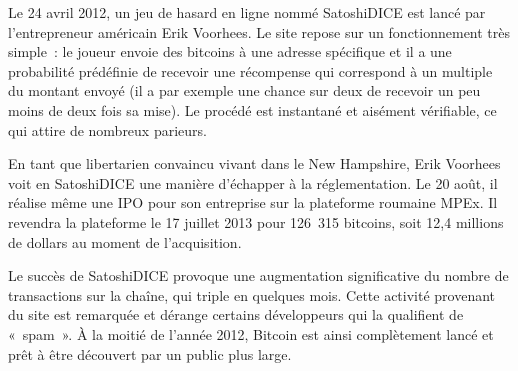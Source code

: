 Le 24 avril 2012, un jeu de hasard en ligne nommé SatoshiDICE est lancé par l'entrepreneur américain Erik Voorhees. Le site repose sur un fonctionnement très simple~: le joueur envoie des bitcoins à une adresse spécifique et il a une probabilité prédéfinie de recevoir une récompense qui correspond à un multiple du montant envoyé (il a par exemple une chance sur deux de recevoir un peu moins de deux fois sa mise). Le procédé est instantané et aisément vérifiable, ce qui attire de nombreux parieurs. %


En tant que libertarien convaincu vivant dans le New Hampshire, Erik Voorhees voit en SatoshiDICE une manière d'échapper à la réglementation. Le 20 août, il réalise même une IPO pour son entreprise sur la plateforme roumaine MPEx. Il revendra la plateforme le 17 juillet 2013 pour 126~315 bitcoins, soit 12,4 millions de dollars au moment de l'acquisition.

Le succès de SatoshiDICE provoque une augmentation significative du nombre de transactions sur la chaîne, qui triple en quelques mois. Cette activité provenant du site est remarquée et dérange certains développeurs qui la qualifient de «~spam~». À la moitié de l'année 2012, Bitcoin est ainsi complètement lancé et prêt à être découvert par un public plus large.

